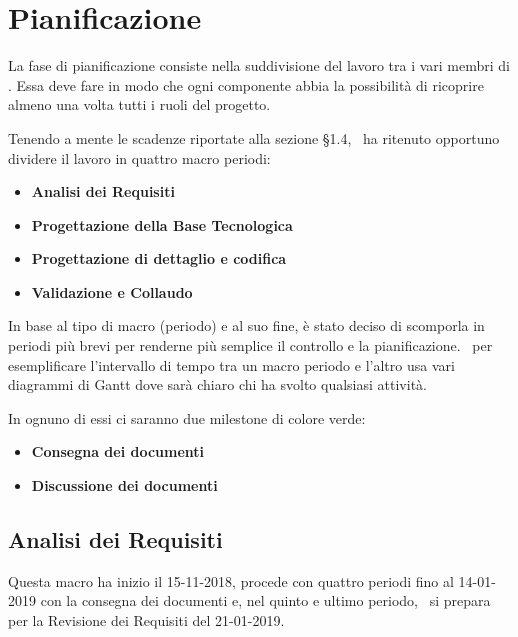 \newpage
\section{Pianificazione}\label{Pianificazione}
    La fase di pianificazione consiste nella suddivisione del lavoro tra i vari membri di \gruppo. Essa deve fare in modo che ogni componente abbia la possibilità di ricoprire almeno una volta tutti i ruoli del progetto.
    
    Tenendo a mente le scadenze riportate alla sezione §1.4, \gruppo\ ha ritenuto opportuno dividere il lavoro in quattro macro periodi:
	\begin{itemize}
	\item \textbf{Analisi dei Requisiti}
	\item \textbf{Progettazione della Base Tecnologica}
	\item \textbf{Progettazione di dettaglio e codifica}
	\item \textbf{Validazione e Collaudo}
	\end{itemize}
    
    In base al tipo di macro (periodo) e al suo fine, è stato deciso di scomporla in periodi più brevi per renderne più semplice il
    controllo e la pianificazione. \gruppo\ per esemplificare l'intervallo di tempo tra un macro periodo e l'altro usa vari
    diagrammi di Gantt dove sarà chiaro chi ha svolto qualsiasi attività.
    
    In ognuno di essi ci saranno due milestone di colore verde:
    
    \begin{itemize}
    	\item \textbf{Consegna dei documenti}
    	\item \textbf{Discussione dei documenti}
    \end{itemize}

    \subsection{Analisi dei Requisiti}
        Questa macro ha inizio il 15-11-2018, procede con quattro periodi fino al 14-01-2019 con la consegna dei documenti e, nel
        quinto e ultimo  periodo, \gruppo\ si prepara per la Revisione dei Requisiti del 21-01-2019.
        
